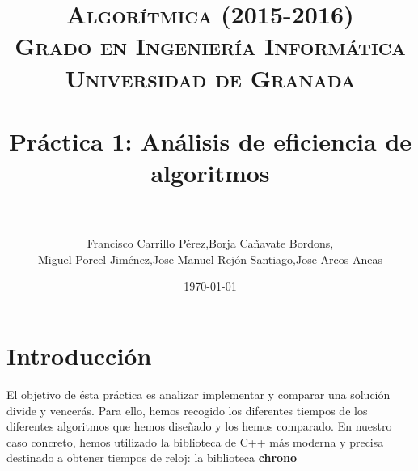 

\title{	
\normalfont \normalsize 
\textsc{{\bf Algorítmica (2015-2016)} \\ Grado en Ingeniería Informática \\ Universidad de Granada} \\ [25pt] %
\horrule{0.5pt} \\[0.4cm] %
\huge Práctica 1: Análisis de eficiencia de algoritmos \\ %
\horrule{2pt} \\[0.5cm] %
}

\author{Francisco Carrillo Pérez,Borja Cañavate Bordons, \\Miguel Porcel Jiménez,Jose Manuel Rejón Santiago,Jose Arcos Aneas} %

\date{\normalsize\today} %




\maketitle %

\newpage %

\tableofcontents %

\listoffigures

\listoftables

\newpage

\section{Introducción }

El objetivo de ésta práctica es analizar implementar y comparar una solución divide y vencerás.
Para ello, hemos recogido los diferentes tiempos de los diferentes algoritmos que hemos diseñado y los hemos comparado.
En nuestro caso concreto, hemos utilizado la biblioteca de C++ más moderna y precisa destinado a obtener tiempos de reloj: la biblioteca \textbf{chrono}

